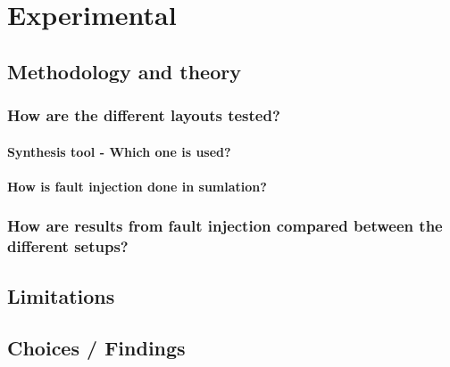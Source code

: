 \chapter{Experimental}
\label{chap4}

\section{Methodology and theory}
\label{sec:method}

\subsection{How are the different layouts tested?}
\subsubsection{Synthesis tool - Which one is used?}
\subsubsection{How is fault injection done in sumlation?}
\subsection{How are results from fault injection compared between the different setups?}

\section{Limitations}
\label{sec:limit}

\section{Choices / Findings}
\label{sec:choice}